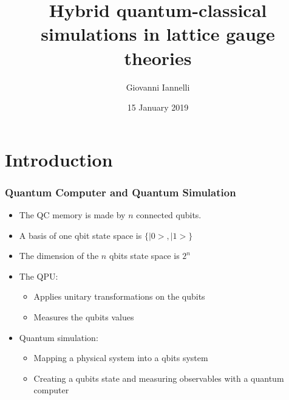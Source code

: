 \documentclass[10pt,t,xcolor=dvipsnames,aspectratio=169]{beamer}
\title[Fellow project presentation]{Hybrid quantum-classical simulations in lattice gauge theories}
\author{Giovanni Iannelli}
\institute{Humboldt University of Berlin}
\date{15 January 2019}
\newlength\leftsidebar
\begin{document}
\leftsidebar
\begin{frame}[plain,t]
\titlepage
\end{frame}
\hoffset=0in %


\section{Introduction}


\begin{frame}
    \frametitle{Quantum Computer and Quantum Simulation}
    \begin{itemize}
        \item
            The QC memory is made by $n$ connected qubits.
        \item
            A basis of one qbit state space is $\{|0>,|1>\}$
        \item
            The dimension of the $n$ qbits state space is $2^n$
        \item
            The QPU:
            \begin{itemize}
                \item Applies unitary transformations on the qubits
                \item Measures the qubits values
            \end{itemize}
        \item
            Quantum simulation:
            \begin{itemize}
                \item
                    Mapping a physical system into a qbits system
                \item
                    Creating a qubits state and measuring observables with a quantum computer
            \end{itemize}
    \end{itemize}
\end{frame}
\end{document}
